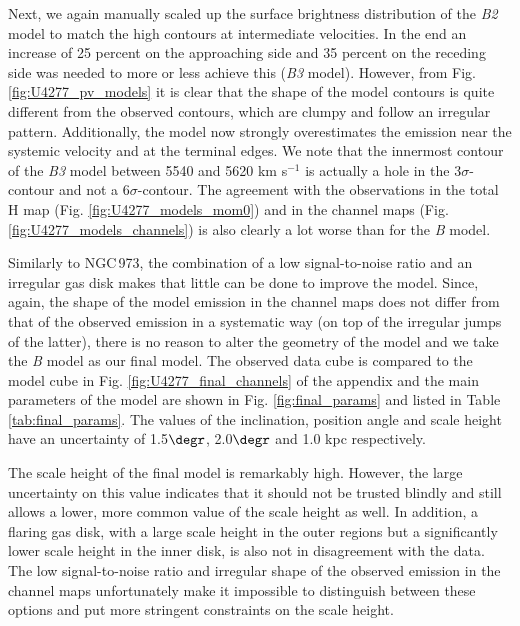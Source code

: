 \documentclass{aa}
\begin{document}
\par
Next, we again manually scaled up the surface brightness distribution of the \emph{B2} model to match the high contours at intermediate velocities. In the end an increase of 25 percent on the approaching side and 35 percent on the receding side was needed to more or less achieve this (\emph{B3} model). However, from Fig. \ref{fig:U4277_pv_models} it is clear that the shape of the model contours is quite different from the observed contours, which are clumpy and follow an irregular pattern. Additionally, the model now strongly overestimates the emission near the systemic velocity and at the terminal edges. We note that the innermost contour of the \emph{B3} model between 5540 and 5620 km s$^{-1}$ is actually a hole in the 3$\sigma$-contour and not a 6$\sigma$-contour. The agreement with the observations in the total H{} map (Fig. \ref{fig:U4277_models_mom0}) and in the channel maps (Fig. \ref{fig:U4277_models_channels}) is also clearly a lot worse than for the \emph{B} model. 
\par
Similarly to NGC\,973, the combination of a low signal-to-noise ratio and an irregular gas disk makes that little can be done to improve the model. Since, again, the shape of the model emission in the channel maps does not differ from that of the observed emission in a systematic way (on top of the irregular jumps of the latter), there is no reason to alter the geometry of the model and we take the \emph{B} model as our final model. The observed data cube is compared to the model cube in Fig. \ref{fig:U4277_final_channels} of the appendix and the main parameters of the model are shown in Fig. \ref{fig:final_params} and listed in Table \ref{tab:final_params}. The values of the inclination, position angle and scale height have an uncertainty of 1.5$\degr$, 2.0$\degr$ and 1.0 kpc respectively.
\par
The scale height of the final model is remarkably high. However, the large uncertainty on this value indicates that it should not be trusted blindly and still allows a lower, more common value of the scale height as well. In addition, a flaring gas disk, with a large scale height in the outer regions but a significantly lower scale height in the inner disk, is also not in disagreement with the data. The low signal-to-noise ratio and irregular shape of the observed emission in the channel maps unfortunately make it impossible to distinguish between these options and put more stringent constraints on the scale height.
\end{document}
